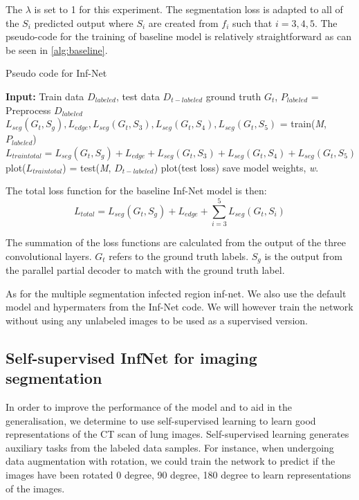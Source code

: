 The $\lambda$ is set to 1 for this experiment. The segmentation loss is adapted to all of the ${S_i}$ predicted output where ${S_i}$ are created from $f_i$ such that $i={3,4,5}$. The pseudo-code for the training of baseline model is relatively straightforward as can be seen in \ref{alg:baseline}.
\begin{algorithm}
	\caption{Pseudo code for Inf-Net}
	\label{alg:baseline}
\begin{algorithmic}
\STATE \textbf{Input:} Train data $D_{labeled}$,  test data $D_{t-labeled}$ ground truth $G_t$,
\STATE $P_{labeled}$ = Preprocess $D_{labeled}$
\STATE $L_{seg}(G_t, S_g), L_{edge}, L_{seg}(G_t, S_3), L_{seg}(G_t, S_4), L_{seg}(G_t, S_5)	$  = train(\textit{M},  $P_{labeled}$)
\STATE $L_{traintotal} = L_{seg}(G_t, S_g) + L_{edge} + L_{seg}(G_t, S_3) + L_{seg}(G_t, S_4) + L_{seg}(G_t, S_5)$
\STATE plot($L_{traintotal}$)
\STATE = test(\textit{M}, $D_{t-labeled}$)
\STATE plot(test loss)
\STATE save model weights, \textit{w}.
\ENDFOR
\end{algorithmic}
\end{algorithm}

The total loss function for the baseline Inf-Net model is then:
\begin{equation}
L_{total} = L_{seg}(G_t, S_g) + L_{edge} + 	\sum_{i=3}^{5}L_{seg}(G_t, S_i)
\end{equation}

The summation of the loss functions are calculated from the output of the three convolutional layers. $G_t$ refers to the ground truth labels. $S_g$ is the output from the parallel partial decoder to match with the ground truth label.

As for the multiple segmentation infected region inf-net. We also use the default model and hypermaters from the Inf-Net code. We will however train the network without using any unlabeled images to be used as a supervised version.

\subsection{Self-supervised InfNet for imaging segmentation}
In order to improve the performance of the model and to aid in the generalisation, we  determine to use self-supervised learning to learn good representations of the CT scan of lung images. Self-supervised learning generates auxiliary tasks from the labeled data samples. For instance, when undergoing data augmentation with rotation, we could train the network to predict if the images have been rotated 0 degree, 90 degree, 180 degree to learn representations of the images. 

